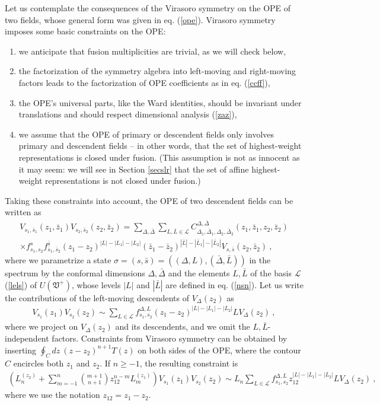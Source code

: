 \documentclass[12pt,a4paper,notitlepage]{report}
\numberwithin{equation}{section}
\theoremstyle{break}
\begin{document}
Let us contemplate the consequences of the Virasoro symmetry on the OPE of two fields, whose general form was given in eq. (\ref{ope}). Virasoro symmetry imposes some basic constraints on the OPE:
\begin{enumerate}
\item we anticipate that fusion multiplicities are trivial, as we will check below,
 \item the factorization of the symmetry algebra into left-moving and right-moving factors leads to the factorization of OPE coefficients as in eq. (\ref{ccff}),
 \item the OPE's universal parts, like the Ward identities, should be invariant under translations and should respect dimensional analysis (\ref{zaz}),
\item we assume that the OPE of primary or descendent fields only involves primary and descendent fields -- in other words, that the set of highest-weight representations is closed under fusion. (This assumption is not as innocent as it may seem: we will see in Section \ref{secslr} that the set of affine highest-weight representations is not closed under fusion.)
\end{enumerate}
Taking these constraints into account, the OPE of two descendent fields can be written as
\begin{multline}
 V_{s_1,\bar{s}_1}(z_1,\bar{z}_1)V_{s_2,\bar{s}_2}(z_2,\bar{z}_2) = \sum_{\Delta,\bar{\Delta}}\sum_{L,\bar{L}\in \mathcal{L}} 
 C_{\Delta_1,\bar{\Delta}_1,\Delta_2,\bar{\Delta}_2}^{\Delta,\bar{\Delta}}(z_1,\bar{z}_1,z_2,\bar{z}_2)
\\ \times
 f_{s_1,s_2}^{s} f_{\bar{s}_1,\bar{s}_2}^{\bar{s}} (z_1-z_2)^{|L|-|L_1|-|L_2|} (\bar{z}_1-\bar{z}_2)^{|\bar{L}|-|\bar{L}_1|-|\bar{L}_2|}
 V_{s,\bar{s}}(z_2,\bar{z}_2) \ ,
\label{vvs}
\end{multline}
where we parametrize a state $\sigma = (s,\bar{s}) = ((\Delta,L),(\bar{\Delta},\bar{L}))$ in the spectrum by the conformal dimensions $\Delta,\bar{\Delta}$ and the elements $L,\bar{L}$ of the basis $\mathcal{L}$ (\ref{lels}) of $U(\mathfrak{V}^+)$, whose levels $|L|$ and $|\bar{L}|$ are defined in eq. (\ref{nsn}). 
Let us write the contributions of the left-moving descendents of $V_\Delta(z_2)$ as 
\begin{align}
 V_{s_1}(z_1)V_{s_2}(z_2) \sim \sum_{L\in \mathcal{L}} f_{s_1,s_2}^{\Delta,L} (z_1-z_2)^{|L|-|L_1|-|L_2|} LV_\Delta(z_2)\ ,
\label{vvlv}
\end{align}
where we project on $V_\Delta(z_2)$ and its descendents, and we omit the $L,\bar{L}$-independent factors. Constraints from Virasoro symmetry can be obtained by inserting $\oint_C dz\ (z-z_2)^{n+1} T(z)$ on both sides of the OPE, where the contour $C$ encircles both $z_1$ and $z_2$. If $n\geq -1$, the resulting constraint is 
\begin{align}
 \left(L_n^{(z_2)}+\sum_{m=-1}^{n}\binom{m+1}{n+1} z_{12}^{n-m}L_{m}^{(z_1)}\right) V_{s_1}(z_1)V_{s_2}(z_2) \sim  L_n\sum_{L\in \mathcal{L}} f_{s_1,s_2}^{\Delta,L} z_{12}^{|L|-|L_1|-|L_2|}  LV_\Delta(z_2)\ ,
\label{zlzd}
\end{align}
where we use the notation $z_{12}=z_1-z_2$.
\end{document}
